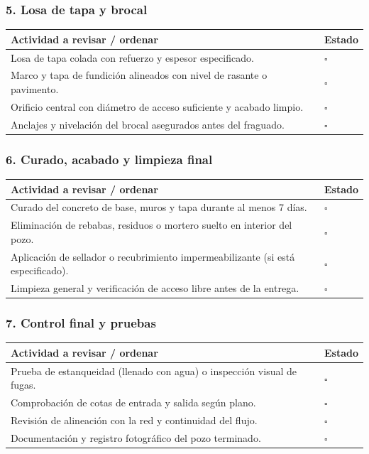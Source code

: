 \documentclass[12pt]{article}
\newcommand{\cbox}{\(\square\)} %
\begin{document}
	\subsubsection*{5. Losa de tapa y brocal}
	\begin{tabularx}{\linewidth}{>{\raggedright\arraybackslash}p{0.93\linewidth} >{\centering\arraybackslash}m{0.07\linewidth}}
		\toprule
		\textbf{Actividad a revisar / ordenar} & \textbf{Estado}\\
		\midrule
		Losa de tapa colada con refuerzo y espesor especificado. & \cbox \\
		Marco y tapa de fundición alineados con nivel de rasante o pavimento. & \cbox \\
		Orificio central con diámetro de acceso suficiente y acabado limpio. & \cbox \\
		Anclajes y nivelación del brocal asegurados antes del fraguado. & \cbox \\
		\bottomrule
	\end{tabularx}
	
	\subsubsection*{6. Curado, acabado y limpieza final}
	\begin{tabularx}{\linewidth}{>{\raggedright\arraybackslash}p{0.93\linewidth} >{\centering\arraybackslash}m{0.07\linewidth}}
		\toprule
		\textbf{Actividad a revisar / ordenar} & \textbf{Estado}\\
		\midrule
		Curado del concreto de base, muros y tapa durante al menos 7 días. & \cbox \\
		Eliminación de rebabas, residuos o mortero suelto en interior del pozo. & \cbox \\
		Aplicación de sellador o recubrimiento impermeabilizante (si está especificado). & \cbox \\
		Limpieza general y verificación de acceso libre antes de la entrega. & \cbox \\
		\bottomrule
	\end{tabularx}
	
	\subsubsection*{7. Control final y pruebas}
	\begin{tabularx}{\linewidth}{>{\raggedright\arraybackslash}p{0.93\linewidth} >{\centering\arraybackslash}m{0.07\linewidth}}
		\toprule
		\textbf{Actividad a revisar / ordenar} & \textbf{Estado}\\
		\midrule
		Prueba de estanqueidad (llenado con agua) o inspección visual de fugas. & \cbox \\
		Comprobación de cotas de entrada y salida según plano. & \cbox \\
		Revisión de alineación con la red y continuidad del flujo. & \cbox \\
		Documentación y registro fotográfico del pozo terminado. & \cbox \\
		\bottomrule
	\end{tabularx}
	
\end{document}
